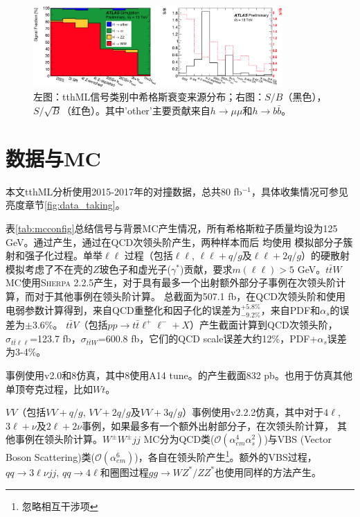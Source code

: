 \begin{figure}[h]
\centering
 \includegraphics[width=0.85\textwidth]{fig/tthML_signal_comp.png}
 \caption{左图：tthML信号类别中希格斯衰变来源分布；右图：$S/B$（黑色），$S/\sqrt{B}$（红色）。其中'other'主要贡献来自$h\rightarrow \mu\mu$和$h\rightarrow b\bar{b}$。\cite{Aaboud:2017jvq}}
 \label{fig:tthML_signal_comp}
\end{figure}

\section{数据与MC}
本文tthML分析使用2015-2017年的对撞数据，总共80 fb$^{-1}$，具体收集情况可参见亮度章节\ref{fig:data_taking}。

表\ref{tab:mcconfig}总结信号与背景MC产生情况，所有希格斯粒子质量均设为125 GeV。\tth 通过\POWHEGBOX 产生，\ttz 通过\MGMCatNLO 在QCD次领头阶产生，两种样本而后
均使用 模拟部分子簇射和强子化过程。单举\ttbar$\ell\ell$ 过程（包括\ttbar$\ell\ell$, \ttbar$\ell\ell+q/g$及\ttbar$\ell\ell+2q/g$）的硬散射模拟考虑了不在壳的$Z$玻色子和虚光子($\gamma^*$)贡献，要求$m(\ell\ell)>5$ GeV。$t\bar{t}W$ MC使用\textsc{Sherpa 2.2.5}产生，对于具有最多一个出射额外部分子事例在次领头阶计算，而对于其他事例在领头阶计算。
\tth 总截面为507.1 fb，在QCD次领头阶和使用电弱参数\cite{Beenakker:2001rj,Beenakker:2002nc,Dawson:2002tg,Dawson:2003zu,Yu:2014cka,Frixione:2014qaa,Frixione:2015zaa}计算得到\cite{Heinemeyer:2013tqa,XSWG13TeV}，来自QCD重整化和因子化的误差为$^{+5.8\%}_{-9.2\%}$，来自PDF和$\alpha_s$的误差为$\pm3.6$\%。
$t\bar{t}V$（包括$pp\rightarrow t\bar{t}\ell^+\ell^-+X$）产生截面计算到QCD次领头阶\cite{Alwall:2014hca,Frixione:2015zaa}，$\sigma_{t\bar{t}\ell\ell}$=123.7 fb，$\sigma_{t\bar{t}W}$=600.8 fb，它们的QCD scale误差大约12\%，PDF+$\alpha_s$误差为3-4\%。

\ttbar 事例使用\POWHEG v2.0和\PYTHIA 8仿真，其中\PYTHIA 8使用A14 tune。\ttbar 的产生截面832 pb。\POWHEG 也用于仿真其他单顶夸克过程，比如$Wt$。

$VV$（包括$VV+q/g$, $VV+2q/g$及$VV+3q/g$）事例使用\SHERPA v2.2.2仿真，其中对于$4\ell$, $3\ell+\nu$及$2\ell+2\nu$事例，如果最多有一个额外出射部分子，在次领头阶计算，
其他事例在领头阶计算。$W^{\pm}W^{\pm}jj$ MC分为QCD类($\mathcal{O}(\alpha_{em}^4\alpha_s^2)$)与VBS (Vector Boson Scattering)类($\mathcal{O}(\alpha_{em}^6)$)，各自在领头阶产生\footnote{忽略相互干涉项}。额外的VBS过程，$qq\rightarrow3\ell\nu jj$, $qq\rightarrow 4\ell$和圈图过程$gg\rightarrow WZ^*/ZZ^*$也使用同样的方法产生。

